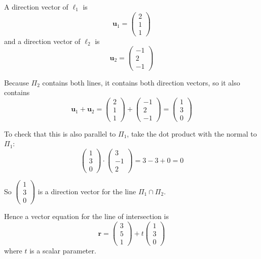 \documentclass[leqno]{article}
\begin{document}
\begin{enumerate}[
  label=\textbf{\arabic*.},
  leftmargin=*,
  topsep=0pt,
  partopsep=0pt,
  parsep=0pt
]
\begin{tcolorbox}[colback=white, colframe=scarlet, title={\textbf{Solution}}, breakable, grow to left by=6mm, grow to right by=10mm]
\begin{enumerate}[label=\textbf{(\alph*)}]
A direction vector of $\ell_1$ is
\[
\mathbf u_1=\begin{pmatrix}2\\1\\1\end{pmatrix}
\]
and a direction vector of $\ell_2$ is
\[
\mathbf u_2=\begin{pmatrix}-1\\2\\-1\end{pmatrix}
\]

Because $\Pi_2$ contains both lines, it contains both direction vectors, so it also contains
\[
\mathbf u_1+\mathbf u_2
=
\begin{pmatrix}2\\1\\1\end{pmatrix}
+
\begin{pmatrix}-1\\2\\-1\end{pmatrix}
=
\begin{pmatrix}1\\3\\0\end{pmatrix}
\]

To check that this is also parallel to $\Pi_1$, take the dot product with the normal to $\Pi_1$:
\[
\begin{pmatrix}1\\3\\0\end{pmatrix}\cdot
\begin{pmatrix}3\\-1\\2\end{pmatrix}
=3-3+0=0
\]

So $\begin{pmatrix}1\\3\\0\end{pmatrix}$ is a direction vector for the line $\Pi_1\cap\Pi_2$.

Hence a vector equation for the line of intersection is
\[
\mathbf r=
\begin{pmatrix}3\\5\\1\end{pmatrix}
+t\begin{pmatrix}1\\3\\0\end{pmatrix}
\]
where $t$ is a scalar parameter.
\end{enumerate}
\end{tcolorbox}



\end{enumerate}
\end{document}
